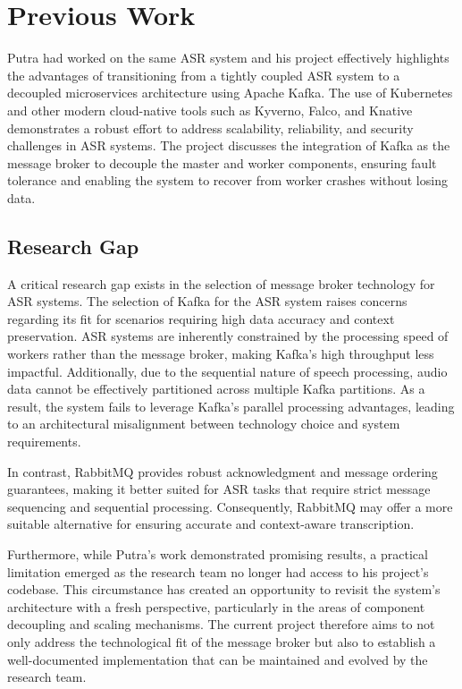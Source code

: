 \section{Previous Work}
Putra \cite{putra} had worked on the same ASR system and his project effectively highlights the advantages of transitioning from a tightly coupled ASR system to a decoupled microservices architecture using Apache Kafka. The use of Kubernetes and other modern cloud-native tools such as Kyverno, Falco, and Knative demonstrates a robust effort to address scalability, reliability, and security challenges in ASR systems. The project discusses the integration of Kafka as the message broker to decouple the master and worker components, ensuring fault tolerance and enabling the system to recover from worker crashes without losing data.

\subsection{Research Gap}
A critical research gap exists in the selection of message broker technology for ASR systems. The selection of Kafka for the ASR system raises concerns regarding its fit for scenarios requiring high data accuracy and context preservation. ASR systems are inherently constrained by the processing speed of workers rather than the message broker, making Kafka’s high throughput less impactful. Additionally, due to the sequential nature of speech processing, audio data cannot be effectively partitioned across multiple Kafka partitions. As a result, the system fails to leverage Kafka’s parallel processing advantages, leading to an architectural misalignment between technology choice and system requirements.

In contrast, RabbitMQ provides robust acknowledgment and message ordering guarantees, making it better suited for ASR tasks that require strict message sequencing and sequential processing. Consequently, RabbitMQ may offer a more suitable alternative for ensuring accurate and context-aware transcription.

Furthermore, while Putra’s work \cite{putra} demonstrated promising results, a practical limitation emerged as the research team no longer had access to his project's codebase. This circumstance has created an opportunity to revisit the system's architecture with a fresh perspective, particularly in the areas of component decoupling and scaling mechanisms. The current project therefore aims to not only address the technological fit of the message broker but also to establish a well-documented implementation that can be maintained and evolved by the research team.

